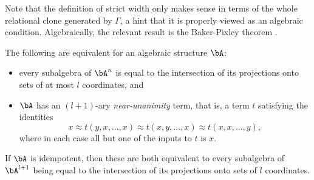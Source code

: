 Note that the definition of strict width only makes sense in terms of the whole relational clone generated by $\Gamma$, a hint that it is properly viewed as an algebraic condition. Algebraically, the relevant result is the Baker-Pixley theorem \cite{baker-pixley}.

\begin{thm} The following are equivalent for an algebraic structure $\bA$:
\begin{itemize}
\item every subalgebra of $\bA^n$ is equal to the intersection of its projections onto sets of at most $l$ coordinates, and

\item $\bA$ has an $(l+1)$-ary \emph{near-unanimity} term, that is, a term $t$ satisfying the identities
\[
x \approx t(y,x,...,x) \approx t(x,y,...,x) \approx t(x,x,...,y),
\]
where in each case all but one of the inputs to $t$ is $x$.
\end{itemize}
If $\bA$ is idempotent, then these are both equivalent to every subalgebra of $\bA^{l+1}$ being equal to the intersection of its projections onto sets of $l$ coordinates.
\end{thm}
